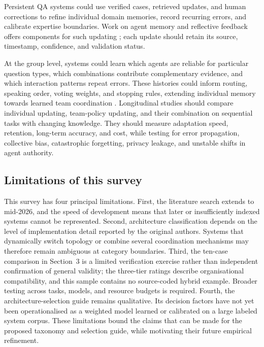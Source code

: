 \documentclass[a4paper,fleqn]{cas-dc}
\begin{document}
Persistent QA systems could use verified cases, retrieved updates, and human
corrections to refine individual domain memories, record recurring errors,
and calibrate expertise boundaries. Work on agent memory and reflective
feedback offers components for such updating
\citep{zhang2024memory_survey,shinn2023reflexion}; each update should retain
its source, timestamp, confidence, and validation status.

At the group level, systems could learn which agents are reliable for
particular question types, which combinations contribute complementary
evidence, and which interaction patterns repeat errors. These histories could
inform routing, speaking order, voting weights, and stopping rules, extending
individual memory towards learned team coordination
\citep{park2023generative_agents,chen2024agentverse}. Longitudinal studies
should compare individual updating, team-policy updating, and their
combination on sequential tasks with changing knowledge. They should measure
adaptation speed, retention, long-term accuracy, and cost, while testing for
error propagation, collective bias, catastrophic forgetting, privacy leakage,
and unstable shifts in agent authority.


\subsection{Limitations of this survey}
\label{sec:survey_limitations}

This survey has four principal limitations. First, the literature search
extends to mid-2026, and the speed of development means that later or
insufficiently indexed systems cannot be represented. Second, architecture
classification depends on the level of implementation detail reported by the
original authors. Systems that dynamically switch topology or combine several
coordination mechanisms may therefore remain ambiguous at category
boundaries. Third, the ten-case comparison in Section~3 is a limited
verification exercise rather than independent confirmation of general validity;
the three-tier ratings describe organisational compatibility, and this sample
contains no source-coded hybrid example. Broader
testing across tasks, models, and resource budgets is required. Fourth, the
architecture-selection guide remains qualitative. Its decision factors have
not yet been operationalised as a weighted model learned or calibrated on a
large labeled system corpus. These limitations bound the claims that can be
made for the proposed taxonomy and selection guide, while motivating their
future empirical refinement.
\end{document}
